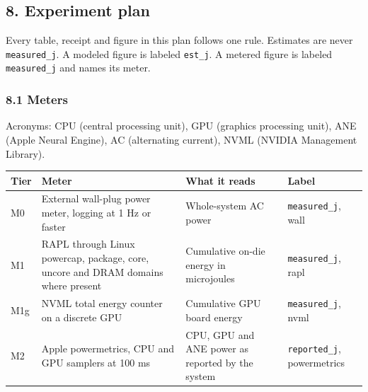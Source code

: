 \documentclass[
  10pt,
]{article}
\newcounter{none} %
\begin{document}
\subsection{8. Experiment plan}\label{experiment-plan}

Every table, receipt and figure in this plan follows one rule. Estimates
are never \texttt{measured\_j}. A modeled figure is labeled
\texttt{est\_j}. A metered figure is labeled \texttt{measured\_j} and
names its meter.

\subsubsection{8.1 Meters}\label{meters}

Acronyms: CPU (central processing unit), GPU (graphics processing unit),
ANE (Apple Neural Engine), AC (alternating current), NVML (NVIDIA
Management Library).

{\def\LTcaptype{none} %
\begin{longtable}[]{@{}
  >{\raggedright\arraybackslash}p{}
  >{\raggedright\arraybackslash}p{}
  >{\raggedright\arraybackslash}p{}
  >{\raggedright\arraybackslash}p{}@{}}
\toprule\noalign{}
\begin{minipage}[b]{\linewidth}\raggedright
Tier
\end{minipage} & \begin{minipage}[b]{\linewidth}\raggedright
Meter
\end{minipage} & \begin{minipage}[b]{\linewidth}\raggedright
What it reads
\end{minipage} & \begin{minipage}[b]{\linewidth}\raggedright
Label
\end{minipage} \\
\midrule\noalign{}
\endhead
\bottomrule\noalign{}
\endlastfoot
M0 & External wall-plug power meter, logging at 1 Hz or faster &
Whole-system AC power & \texttt{measured\_j}, wall \\
M1 & RAPL through Linux powercap, package, core, uncore and DRAM domains
where present & Cumulative on-die energy in microjoules &
\texttt{measured\_j}, rapl \\
M1g & NVML total energy counter on a discrete GPU & Cumulative GPU board
energy & \texttt{measured\_j}, nvml \\
M2 & Apple powermetrics, CPU and GPU samplers at 100 ms & CPU, GPU and
ANE power as reported by the system & \texttt{reported\_j},
powermetrics \\
\end{longtable}
}
\end{document}
